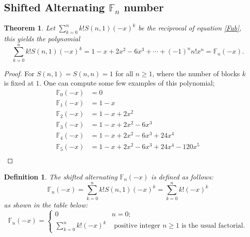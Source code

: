 \documentclass[pdflatex,sn-mathphys-num]{sn-jnl}%
\newtheorem{theorem}{Theorem}
\newtheorem{definition}{Definition}
\theoremstyle{thmstyleone}%
\theoremstyle{thmstyletwo}%
\theoremstyle{thmstylethree}%
\begin{document}
\subsection{Shifted Alternating $\mathbb{F}_n$ number}
\begin{theorem}\label{FK}
Let $\sum_{k=0}^n k! S(n,1)(-x)^k$ be the reciprocal of equation \ref{Fub}, this yields the polynomial
$$\sum_{k=0}^n k! S(n,1)(-x)^k=1-x+2x^2-6x^3+\cdots+(-1)^nn!x^n=\mathbb{F}_{n}(-x).$$   
\end{theorem}
\begin{proof}
For $S(n,1)=S(n,n)=1$ for all $n\geq 1$, where the number of blocks $k$ is fixed at $1$. One can compute some few examples of this polynomial;
\begin{align}\label{FT}
\mathbb{F}_{0}(-x) &= 0\\ \nonumber
\mathbb{F}_{1}(-x) &= 1 - x\\  \nonumber
\mathbb{F}_{2}(-x) &= 1 - x + 2x^2\\  \nonumber
\mathbb{F}_{3}(-x) &= 1 - x + 2x^2 - 6x^3\\  \nonumber
\mathbb{F}_{4}(-x) &= 1 - x + 2x^2 - 6x^3 + 24x^4\\  \nonumber
\mathbb{F}_{5}(-x) &= 1 - x + 2x^2 - 6x^3 + 24x^4 - 120x^5\\  \nonumber
\end{align}
\end{proof}

\begin{definition}
    The shifted alternating $\mathbb{F}_n(-x)$ is defined as follows:
    \begin{equation*}
\mathbb{F}_n(-x)=\sum_{k=0}^n k! S(n,1)(-x)^k=\sum_{k=0}^n k!(-x)^k
 \end{equation*}
 as shown in the table below:
 \begin{equation*}
\mathbb{F}_n(-x)=
\begin{cases}
	\text{0}    & \text{$n=0$;}\\
	\text{$\sum_{k=0}^n k!(-x)^k$}   & \text{ positive integer $n\geq 1$ is the usual  factorial}.
\end{cases}
 \end{equation*}
\end{definition}
\end{document}
